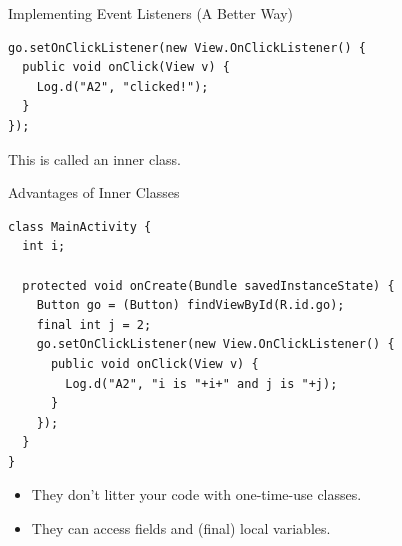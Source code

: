 \documentclass[aspectratio=169]{beamer}
\begin{document}
\begin{frame}[fragile]{Implementing Event Listeners (A Better Way)}

{\small
\begin{verbatim}
go.setOnClickListener(new View.OnClickListener() {
  public void onClick(View v) {
    Log.d("A2", "clicked!");
  }
}); 
\end{verbatim}
}

{\Large This is called an \alert{inner class}.}

\end{frame}



\begin{frame}[fragile]{Advantages of Inner Classes}

\begin{Verbatim}[fontsize=\footnotesize]
class MainActivity {
  int i;

  protected void onCreate(Bundle savedInstanceState) {
    Button go = (Button) findViewById(R.id.go);
    final int j = 2;
    go.setOnClickListener(new View.OnClickListener() {
      public void onClick(View v) {
        Log.d("A2", "i is "+i+" and j is "+j);
      }
    }); 
  }
}
\end{Verbatim}
\pause
\begin{itemize}
\item They don't litter your code with one-time-use classes.
\pause
\item They can access fields and (final) local variables.
\end{itemize}

\end{frame}
\end{document}
